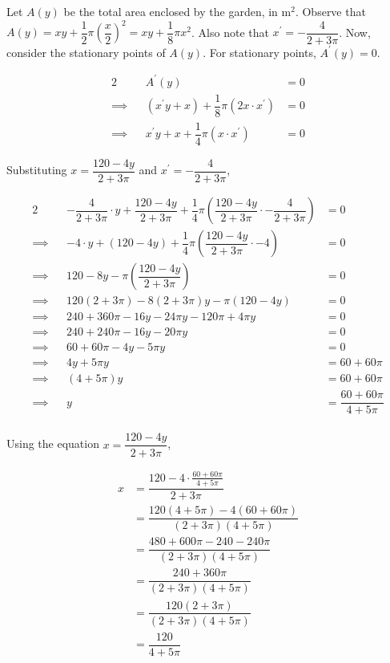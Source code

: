 \documentclass{jhwhw}
\begin{document}
        Let $A(y)$ be the total area enclosed by the garden, in m$^2$. Observe that $A(y) = xy + \dfrac12 \pi \left(\dfrac{x}2\right)^2 = xy + \dfrac18 \pi x^2$. Also note that $x^\prime = -\dfrac4{2 + 3\pi}$. Now, consider the stationary points of $A(y)$. For stationary points, $A^\prime(y) = 0$.

        \begin{alignat*}{2}
            &&A^\prime(y) &= 0\\
            \implies&&\left(x^\prime y + x\right) + \dfrac18 \pi (2x \cdot x^\prime) &= 0\\
            \implies&&x^\prime y + x + \dfrac14 \pi (x \cdot x^\prime) &= 0
        \end{alignat*}

        Substituting $x = \dfrac{120-4y}{2+3\pi}$ and $x^\prime = -\dfrac4{2 + 3\pi}$,

        \begin{alignat*}{2}
            &&-\dfrac4{2 + 3\pi} \cdot y + \dfrac{120-4y}{2+3\pi} + \dfrac14 \pi \left(\dfrac{120-4y}{2+3\pi} \cdot -\dfrac4{2 + 3\pi}\right) &= 0\\
            \implies&&-4 \cdot y + (120-4y) + \dfrac14 \pi \left(\dfrac{120-4y}{2+3\pi} \cdot -4\right) &= 0\\
            \implies&&120 - 8y - \pi \left(\dfrac{120-4y}{2+3\pi}\right) &= 0\\
            \implies&&120(2+3\pi) - 8(2+3\pi)y - \pi(120-4y) &= 0\\
            \implies&&240 + 360\pi - 16y - 24\pi y - 120\pi + 4\pi y &= 0\\
            \implies&&240 + 240\pi - 16y - 20\pi y &= 0\\
            \implies&&60 + 60\pi - 4y - 5\pi y &= 0\\
            \implies&& 4y + 5\pi y &= 60 + 60\pi\\
            \implies&& (4 + 5\pi)y &= 60 + 60\pi\\
            \implies&& y &= \dfrac{60 + 60\pi}{4 + 5\pi}\\
        \end{alignat*}

        Using the equation $x = \dfrac{120-4y}{2 + 3\pi}$, 

        \begin{align*}
            x &= \dfrac{120-4\cdot\tfrac{60 + 60\pi}{4 + 5\pi}}{2 + 3\pi}\\
            &= \dfrac{120(4+5\pi) - 4(60 + 60\pi)}{(2+3\pi)(4+5\pi)}\\
            &= \dfrac{480 + 600\pi - 240 -240\pi}{(2+3\pi)(4+5\pi)}\\
            &= \dfrac{240 + 360\pi}{(2+3\pi)(4+5\pi)}\\
            &= \dfrac{120 (2 + 3\pi)}{(2+3\pi)(4+5\pi)}\\
            &= \dfrac{120}{4+5\pi}
        \end{align*}
\end{document}

